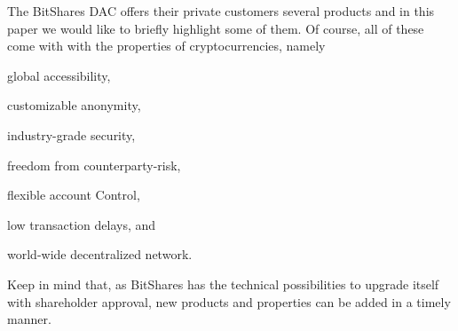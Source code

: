 The BitShares DAC offers their private customers several products and in this
paper we would like to briefly highlight some of them. Of course, all of these
come with with the properties of cryptocurrencies, namely
\begin{inparaenum}[(a)]
 \item global accessibility,
 \item customizable anonymity,
 \item industry-grade security,
 \item freedom from counterparty-risk,
 \item flexible account Control,
 \item low transaction delays, and
 \item world-wide decentralized network.
\end{inparaenum}

Keep in mind that, as BitShares has the technical possibilities to upgrade
itself with shareholder approval, new products and properties can be added in a
timely manner.
